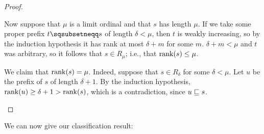 \documentclass[11pt]{article} %
\begin{document}
\begin{lemma}
\begin{proof}
\begin{enumerate}[(i): ]
        Now suppose that $\mu$ is a limit ordinal and that $s$ has length $\mu$.  If we take some proper prefix $t\pprefix s$ of length $\delta<\mu$, then $t$ is weakly increasing, so by the induction hypothesis it has rank at most $\delta+m$ for some $m$.  $\delta+m<\mu$ and $t$ was arbitrary, so it follows that $s\in R_\mu$; i.e., that $\operatorname{rank}(s)\le\mu$.  

        We claim that $\operatorname{rank}(s)=\mu$.  Indeed, suppose that $s\in R_\delta$ for some $\delta<\mu$.  Let $u$ be the prefix of $s$ of length $\delta+1$.  By the induction hypothesis, $\operatorname{rank}(u)\ge\delta+1>\operatorname{rank}(s)$, which is a contradiction, since $u\sqsubseteq s$.  \qedhere
    \end{enumerate}
  \end{proof}
\end{lemma}

We can now give our classification result:
\end{document}
